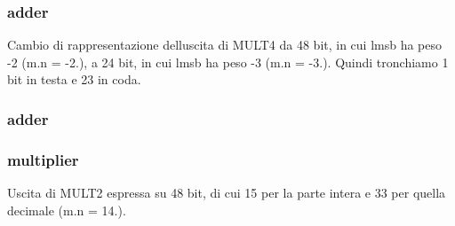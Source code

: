 \subsubsection[{\texorpdfstring{add1}{add1}}]{ {\bfseries \textcolor{vhdlchar}{adder}\textcolor{vhdlchar}{ }} \hspace{0.3cm}{\ttfamily [Instantiation]}}\hypertarget{class_linear_regression_1_1_structural_adea88291834bfbc1cfe284774c792d37}{}\label{class_linear_regression_1_1_structural_adea88291834bfbc1cfe284774c792d37}
Cambio di rappresentazione dell\textquotesingle{}uscita di M\+U\+L\+T4 da 48 bit, in cui l\textquotesingle{}msb ha peso -\/2 (m.\+n = -\/2.), a 24 bit, in cui l\textquotesingle{}msb ha peso -\/3 (m.\+n = -\/3.). Quindi tronchiamo 1 bit in testa e 23 in coda. 
\subsubsection[{\texorpdfstring{add2}{add2}}]{ {\bfseries \textcolor{vhdlchar}{adder}\textcolor{vhdlchar}{ }} \hspace{0.3cm}{\ttfamily [Instantiation]}}\hypertarget{class_linear_regression_1_1_structural_a09e3b860880a85f376374594ffd092fb}{}\label{class_linear_regression_1_1_structural_a09e3b860880a85f376374594ffd092fb}
\subsubsection[{\texorpdfstring{mult1}{mult1}}]{ {\bfseries \textcolor{vhdlchar}{multiplier}\textcolor{vhdlchar}{ }} \hspace{0.3cm}{\ttfamily [Instantiation]}}\hypertarget{class_linear_regression_1_1_structural_abe2dbada52541335e367815bffe06c28}{}\label{class_linear_regression_1_1_structural_abe2dbada52541335e367815bffe06c28}
Uscita di M\+U\+L\+T2 espressa su 48 bit, di cui 15 per la parte intera e 33 per quella decimale (m.\+n = 14.). 
